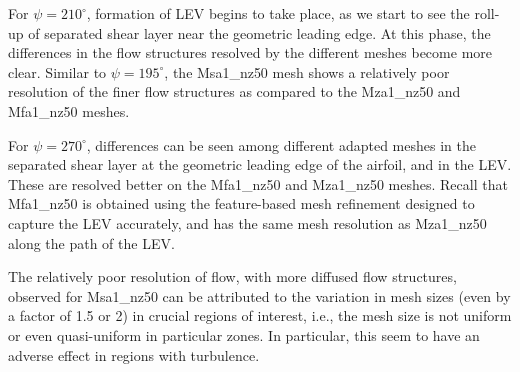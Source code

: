 



For $\psi=210^\circ$, formation of LEV begins to take place, as we start to see the roll-up of separated shear layer near the geometric leading edge. 
At this phase, the differences in the flow structures resolved by the different meshes become more clear.
Similar to $\psi=195^\circ$, the Msa1\_nz50 mesh shows a relatively poor resolution of the finer flow structures as compared to the Mza1\_nz50 and Mfa1\_nz50 meshes.

For $\psi=270^\circ$, differences can be seen among different adapted meshes in the separated shear layer at the geometric leading edge of the airfoil, and in the LEV.
These are resolved better on the Mfa1\_nz50 and Mza1\_nz50 meshes. 
Recall that Mfa1\_nz50 is obtained using the feature-based mesh refinement designed to capture the LEV accurately, and has the same mesh resolution as Mza1\_nz50 along the path of the LEV. 

The relatively poor resolution of flow, with more diffused flow structures, observed for Msa1\_nz50 can be attributed to the variation in mesh sizes (even by a factor of 1.5 or 2) in crucial regions of interest, i.e., the mesh size is not uniform or even quasi-uniform in particular zones. In particular, this seem to have an adverse effect in regions with turbulence.

